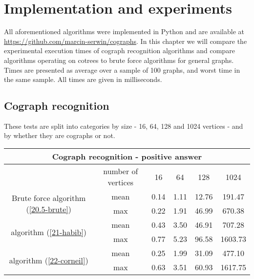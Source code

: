 
\chapter{Implementation and experiments}
\label{r:experiments}

All aforementioned algorithms were implemented in Python and are available at \url{https://github.com/marcin-serwin/cographs}. In this chapter we will compare the experimental execution times of cograph recognition algorithms and compare algorithms operating on cotrees to brute force algorithms for general graphs. Times are presented as average over a sample of 100 graphs, and worst time in the same sample. All times are given in milliseconds.

\section{Cograph recognition}
These tests are split into categories by size - 16, 64, 128 and 1024 vertices - and by whether they are cographs or not.

\begin{center}

    \begin{tabular}{ |c|c|c|c|c|c|}
        \hline
        \multicolumn{6}{|c|}{Cograph recognition - positive answer}                                                        \\
        \hline
                                                                      & number of vertices & 16   & 64   & 128   & 1024    \\
        \hline
        \multirow{2}{*}{Brute force algorithm (\ref{20.5-brute})}     & mean               & 0.14 & 1.11 & 12.76 & 191.47  \\
                                                                      & max                & 0.22 & 1.91 & 46.99 & 670.38  \\
        \hline
        \multirow{2}{*}{\cite{habib} algorithm (\ref{21-habib})}      & mean               & 0.43 & 3.50 & 46.91 & 707.28  \\
                                                                      & max                & 0.77 & 5.23 & 96.58 & 1603.73 \\
        \hline
        \multirow{2}{*}{\cite{corneil} algorithm (\ref{22-corneil}) } & mean               & 0.25 & 1.99 & 31.09 & 477.10  \\
                                                                      & max                & 0.63 & 3.51 & 60.93 & 1617.75 \\
        \hline
    \end{tabular}
\end{center}

